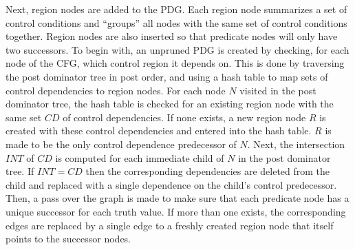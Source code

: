 Next, region nodes are added to the PDG. 
Each region node summarizes a set of control conditions and ``groups'' all nodes with the same set of control conditions together. 
Region nodes are also inserted so that predicate nodes will only have two successors. 
To begin with, an unpruned PDG is created by checking, for each node of the CFG, which control region it depends on. 
This is done by traversing the post dominator tree in post order, and using a hash table to map sets of control dependencies to region nodes. 
For each node $N$ visited in the post dominator tree, the hash table is checked for an existing region node with the same set $CD$ of control dependencies. 
If none exists, a new region node $R$ is created with these control dependencies and entered into the hash table. 
$R$ is made to be the only control dependence predecessor of $N$. 
Next, the intersection $INT$ of $CD$ is computed for each immediate child of $N$ in the post dominator tree. 
If $INT=CD$ then the corresponding dependencies are deleted from the child and replaced with a single dependence on the child's control predecessor. 
Then, a pass over the graph is made to make sure that each predicate node has a unique successor for each truth value. 
If more than one exists, the corresponding edges are replaced by a single edge to a freshly created region node that itself points to the successor nodes.


